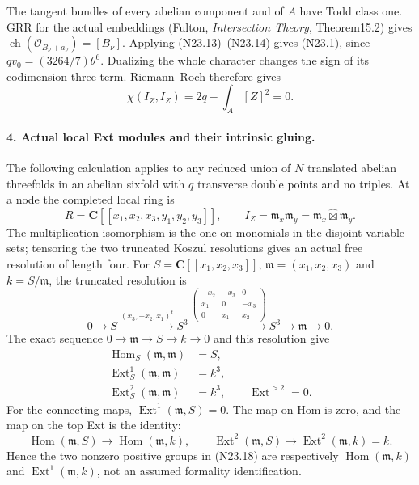 The tangent bundles of every abelian component and of $A$ have
Todd class one. GRR for the actual embeddings (Fulton,
\emph{Intersection Theory}, Theorem15.2) gives
$\operatorname{ch}(\mathcal O_{B_\nu+a_\nu})=[B_\nu]$.
Applying (N23.13)--(N23.14) gives (N23.1), since
$qv_0=(3264/7)\theta^6$. Dualizing the whole character changes
the sign of its codimension-three term. Riemann--Roch therefore
gives
\[
              \chi(I_Z,I_Z)=2q-\int_A[Z]^2=0.               \tag{N23.15}
\]

\paragraph{4. Actual local Ext modules and their intrinsic gluing.}
The following calculation applies to any reduced union of $N$
translated abelian threefolds in an abelian sixfold with $q$
transverse double points and no triples. At a node the completed
local ring is
\[
 R=\mathbf C[[x_1,x_2,x_3,y_1,y_2,y_3]],\qquad
 I_Z=\mathfrak m_x\mathfrak m_y
       =\mathfrak m_x\widehat\boxtimes\mathfrak m_y.         \tag{N23.16}
\]
The multiplication isomorphism is the one on monomials in the
disjoint variable sets; tensoring the two truncated Koszul
resolutions gives an actual free resolution of length four.
For $S=\mathbf C[[x_1,x_2,x_3]]$, $\mathfrak m=(x_1,x_2,x_3)$
and $k=S/\mathfrak m$, the truncated resolution is
\[
 0\longrightarrow S\xrightarrow{(x_3,-x_2,x_1)^t}
 S^3\xrightarrow{
 \left(\begin{smallmatrix}-x_2&-x_3&0\\x_1&0&-x_3\\0&x_1&x_2\end{smallmatrix}\right)}
 S^3\longrightarrow\mathfrak m\longrightarrow0.             \tag{N23.17}
\]
The exact sequence $0\to\mathfrak m\to S\to k\to0$ and
this resolution give
\[
 \begin{split}
 \operatorname{Hom}_S(\mathfrak m,\mathfrak m)&=S,\\
 \operatorname{Ext}^1_S(\mathfrak m,\mathfrak m)&=k^3,\\
 \operatorname{Ext}^2_S(\mathfrak m,\mathfrak m)&=k^3,
 \qquad\operatorname{Ext}^{>2}=0.
 \end{split}                                                  \tag{N23.18}
\]
For the connecting maps, $\operatorname{Ext}^1(\mathfrak m,S)=0$.
The map on Hom is zero, and the map on the top Ext is the identity:
\[
 \operatorname{Hom}(\mathfrak m,S)\longrightarrow
 \operatorname{Hom}(\mathfrak m,k),\qquad
 \operatorname{Ext}^2(\mathfrak m,S)\longrightarrow
 \operatorname{Ext}^2(\mathfrak m,k)=k.
\]
Hence the two nonzero positive groups in
(N23.18) are respectively
$\operatorname{Hom}(\mathfrak m,k)$ and
$\operatorname{Ext}^1(\mathfrak m,k)$, not an assumed formality
identification.

